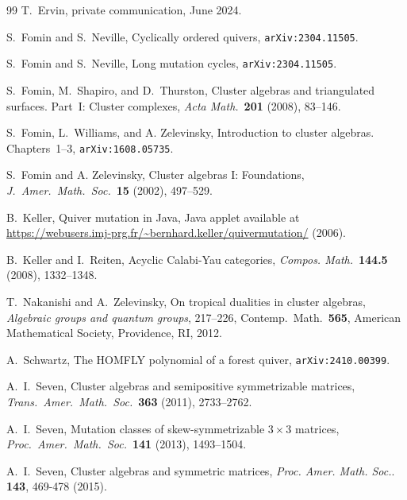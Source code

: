 \documentclass[11pt, letterpaper]{amsart}
\theoremstyle{definition}
\numberwithin{equation}{section}
\begin{document}
\begin{thebibliography}{99}
T.~Ervin, private communication, June 2024.

S.~Fomin and S.~Neville,
Cyclically ordered quivers,
\texttt{arXiv:2304.11505}. 

S.~Fomin and S.~Neville,
Long mutation cycles,
\texttt{arXiv:2304.11505}. 

S.~Fomin, M.~Shapiro, and D.~Thurston, 
Cluster algebras and triangulated surfaces. Part~I: Cluster complexes,
\textsl{Acta Math.}\ \textbf{201} (2008), 83--146. 

S.~Fomin, L.~Williams, and A. Zelevinsky, 
Introduction to cluster algebras. Chapters~1--3,
\texttt{arXiv:1608.05735}. 

S.~Fomin and A. Zelevinsky, 
Cluster algebras I: Foundations, 
\textsl{J.~Amer.\ Math.\ Soc.}\ \textbf{15} (2002), 497--529. 

B.~Keller,
Quiver mutation in Java,
Java applet available at \url{https://webusers.imj-prg.fr/~bernhard.keller/quivermutation/} (2006).

B.~Keller and I.~Reiten,
Acyclic Calabi-Yau categories,
\textsl{Compos. Math.}\ \textbf{144.5} (2008), 1332--1348.

T.~Nakanishi and A.~Zelevinsky, 
On tropical dualities in cluster algebras,
\emph{Algebraic groups and quantum groups}, 217--226, 
Contemp.\ Math.\ \textbf{565}, 
American Mathematical Society, Providence, RI, 2012.

A.~Schwartz,
The HOMFLY polynomial of a forest quiver,
\texttt{arXiv:2410.00399}.


A.~I.~Seven,
Cluster algebras and semipositive symmetrizable matrices,
\textsl{Trans.\ Amer.\ Math.\ Soc.}\ \textbf{363} (2011), 2733--2762.

A.~I.~Seven, 
Mutation classes of skew-symmetrizable $3 \times 3$ matrices,
\textsl{Proc.\ Amer.\ Math.\ Soc.}\ \textbf{141} (2013), 1493--1504.

A.~I.~Seven, 
Cluster algebras and symmetric matrices,
 \textsl{Proc. Amer. Math. Soc.}. 
 \textbf{143}, 469-478 (2015). %
  

\end{thebibliography}
\end{document}
